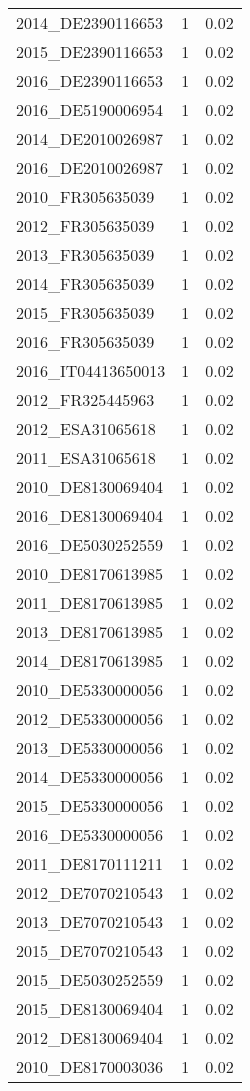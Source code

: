 \begin{table*}[htbp]
\begin{tabular}{lrr}
2014_DE2390116653 & 1 & 0.02 \\
2015_DE2390116653 & 1 & 0.02 \\
2016_DE2390116653 & 1 & 0.02 \\
2016_DE5190006954 & 1 & 0.02 \\
2014_DE2010026987 & 1 & 0.02 \\
2016_DE2010026987 & 1 & 0.02 \\
2010_FR305635039 & 1 & 0.02 \\
2012_FR305635039 & 1 & 0.02 \\
2013_FR305635039 & 1 & 0.02 \\
2014_FR305635039 & 1 & 0.02 \\
2015_FR305635039 & 1 & 0.02 \\
2016_FR305635039 & 1 & 0.02 \\
2016_IT04413650013 & 1 & 0.02 \\
2012_FR325445963 & 1 & 0.02 \\
2012_ESA31065618 & 1 & 0.02 \\
2011_ESA31065618 & 1 & 0.02 \\
2010_DE8130069404 & 1 & 0.02 \\
2016_DE8130069404 & 1 & 0.02 \\
2016_DE5030252559 & 1 & 0.02 \\
2010_DE8170613985 & 1 & 0.02 \\
2011_DE8170613985 & 1 & 0.02 \\
2013_DE8170613985 & 1 & 0.02 \\
2014_DE8170613985 & 1 & 0.02 \\
2010_DE5330000056 & 1 & 0.02 \\
2012_DE5330000056 & 1 & 0.02 \\
2013_DE5330000056 & 1 & 0.02 \\
2014_DE5330000056 & 1 & 0.02 \\
2015_DE5330000056 & 1 & 0.02 \\
2016_DE5330000056 & 1 & 0.02 \\
2011_DE8170111211 & 1 & 0.02 \\
2012_DE7070210543 & 1 & 0.02 \\
2013_DE7070210543 & 1 & 0.02 \\
2015_DE7070210543 & 1 & 0.02 \\
2015_DE5030252559 & 1 & 0.02 \\
2015_DE8130069404 & 1 & 0.02 \\
2012_DE8130069404 & 1 & 0.02 \\
2010_DE8170003036 & 1 & 0.02 \\

\end{tabular}
\end{table*}
